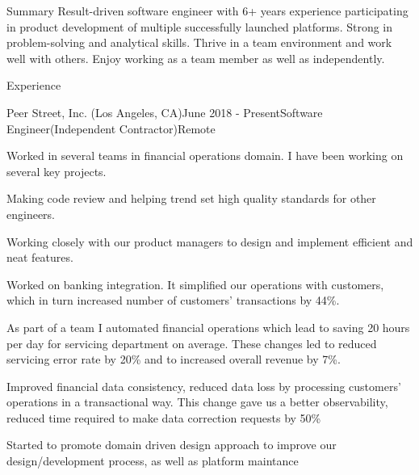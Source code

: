 \documentclass{resume}
\begin{document}
  \begin{rSection}{Summary}
    {Result-driven software engineer with 6+ years experience participating in product development of multiple successfully launched platforms. Strong in problem-solving and analytical skills. Thrive in a team environment and work well with others. Enjoy working as a team member as well as independently. }
  \end{rSection}

  \begin{rSection}{Experience}
    \begin{rSubsection}{Peer Street, Inc. (Los Angeles, CA)}{June 2018 - Present}{Software Engineer(Independent Contractor)}{Remote}
    \item Worked in several teams in financial operations domain. I have been working on several key projects.
    \item Making code review and helping trend set high quality standards for other engineers.
    \item Working closely with our product managers to design and implement efficient and neat features.
    \item Worked on banking integration. It simplified our operations with customers, which in turn increased number of customers' transactions by 44\%.
    \item As part of a team I automated financial operations which lead to saving 20 hours per day for servicing department on average. These changes led to reduced servicing error rate by 20\% and to increased overall revenue by 7\%.
    \item Improved financial data consistency, reduced data loss by processing customers' operations in a transactional way. This change gave us a better observability, reduced time required to make data correction requests by 50\%
    \item Started to promote domain driven design approach to improve our design/development process, as well as platform maintance
    \end{rSubsection}


\end{rSection}
\end{document}
